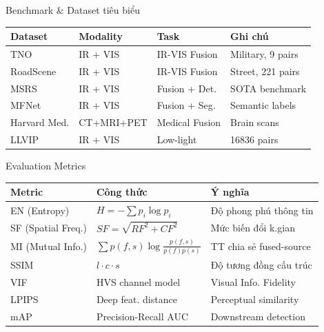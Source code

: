 \documentclass{beamer}
\begin{document}
\begin{frame}{Benchmark \& Dataset tiêu biểu}
    \begin{table}
        \centering
        \small
        \renewcommand{\arraystretch}{1.2}
        \begin{tabular}{|l|l|l|l|}
            \hline
            \textbf{Dataset} & \textbf{Modality} & \textbf{Task} & \textbf{Ghi chú} \\ \hline
            TNO & IR + VIS & IR-VIS Fusion & Military, 9 pairs \\ \hline
            RoadScene & IR + VIS & IR-VIS Fusion & Street, 221 pairs \\ \hline
            MSRS & IR + VIS & Fusion + Det. & SOTA benchmark \\ \hline
            MFNet & IR + VIS & Fusion + Seg. & Semantic labels \\ \hline
            Harvard Med. & CT+MRI+PET & Medical Fusion & Brain scans \\ \hline
            LLVIP & IR + VIS & Low-light & 16836 pairs \\ \hline
        \end{tabular}
    \end{table}
\end{frame}

\begin{frame}{Evaluation Metrics}
    \begin{table}
        \centering
        \small
        \renewcommand{\arraystretch}{1.3}
        \begin{tabular}{|l|l|l|}
            \hline
            \textbf{Metric} & \textbf{Công thức} & \textbf{Ý nghĩa} \\ \hline
            EN (Entropy) & $H = -\sum p_i \log p_i$ & Độ phong phú thông tin \\ \hline
            SF (Spatial Freq.) & $SF = \sqrt{RF^2 + CF^2}$ & Mức biến đổi k.gian \\ \hline
            MI (Mutual Info.) & $\sum p(f,s) \log\frac{p(f,s)}{p(f)p(s)}$ & TT chia sẻ fused-source \\ \hline
            SSIM & $l \cdot c \cdot s$ & Độ tương đồng cấu trúc \\ \hline
            VIF & HVS channel model & Visual Info. Fidelity \\ \hline
            LPIPS & Deep feat. distance & Perceptual similarity \\ \hline
            mAP & Precision-Recall AUC & Downstream detection \\ \hline
        \end{tabular}
    \end{table}
\end{frame}
\end{document}
